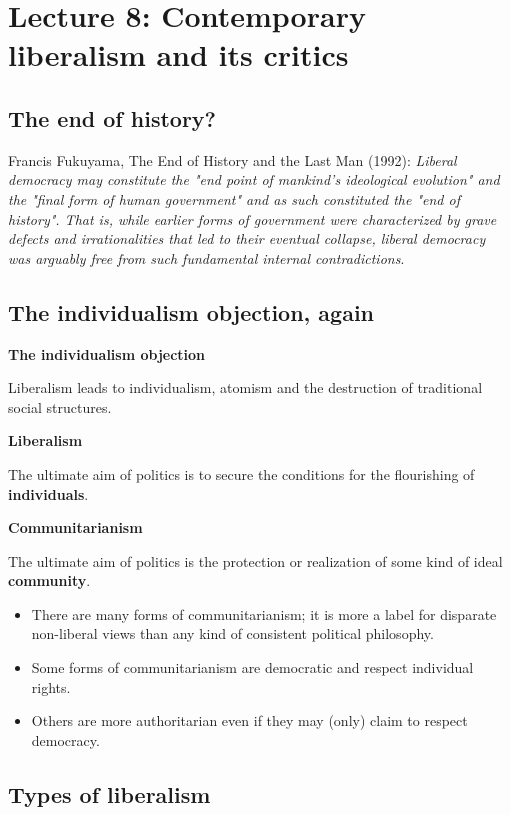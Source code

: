 \section{Lecture 8: Contemporary liberalism and its critics}

\subsection{The end of history?}

Francis Fukuyama, The End of History and the Last Man (1992):
\textit{Liberal democracy may constitute the "end point of mankind's
ideological evolution" and the "final form of human government" and as such
constituted the "end of history". That is, while earlier forms of government
were characterized by grave defects and irrationalities that led to their
eventual collapse, liberal democracy was arguably free from such fundamental
internal contradictions}.

\subsection{The individualism objection, again}

\textbf{The individualism objection}

Liberalism leads to individualism, atomism and the destruction of traditional
social structures.

\textbf{Liberalism}

The ultimate aim of politics is to secure the conditions for the flourishing of
\textbf{individuals}.

\textbf{Communitarianism}

The ultimate aim of politics is the protection or realization of some kind of
ideal \textbf{community}.
\begin{itemize}
	\item There are many forms of communitarianism; it is more a label for
	 disparate non-liberal views than any kind of consistent political
	 philosophy.
	\item Some forms of communitarianism are democratic and respect
	 individual rights.
	\item Others are more authoritarian even if they may (only) claim to
	 respect democracy.
\end{itemize}

\subsection{Types of liberalism}

